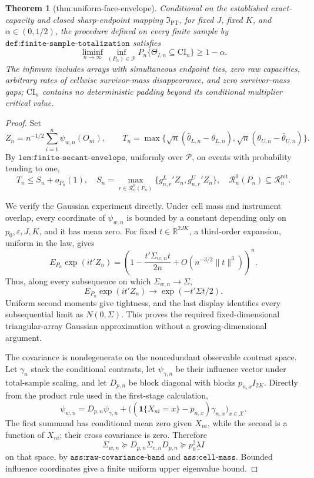 \documentclass{article}
\newtheorem{theorem}{Theorem}
\begin{document}
\begin{theorem}[thm:uniform-face-envelope]\label{thm:uniform-face-envelope}
Conditional on the established exact-capacity and closed sharp-endpoint mapping \(\mathfrak I_{\mathrm{PT}}\), for fixed \(J\), fixed \(K\), and \(\alpha\in(0,1/2)\), the procedure defined on every finite sample by \(\texttt{def:finite-sample-totalization}\) satisfies \[\liminf_{n\to\infty}\inf_{(P_n)\in\mathcal P}P_n\{\Theta_{I,n}\subseteq\mathrm{CI}_n\}\ge1-\alpha.\] The infimum includes arrays with simultaneous endpoint ties, zero raw capacities, arbitrary rates of cellwise survivor-mass disappearance, and zero survivor-mass gaps; \(\mathrm{CI}_n\) contains no deterministic padding beyond its conditional multiplier critical value.
\end{theorem}
\begin{proof}
Set
\[
 Z_n=n^{-1/2}\sum_{i=1}^n\psi_{w,n}(O_{ni}),
 \qquad
 T_n=\max\{\sqrt n(\widehat\theta_{L,n}-\theta_{L,n}),
              \sqrt n(\theta_{U,n}-\widehat\theta_{U,n})\}.
\]
By \(\texttt{lem:finite-secant-envelope}\), uniformly over \(\mathcal P\), on events with probability tending to one,
\[
 T_n\le S_n+o_{P_n}(1),
 \quad
 S_n=\max_{r\in\mathcal R_n^0(P_n)}
 \{g^L_{n,r}{}'Z_n,g^U_{n,r}{}'Z_n\},
 \quad
 \mathcal R_n^0(P_n)\subseteq\mathcal R_n^{\mathrm{ret}}.
\]

We verify the Gaussian experiment directly. Under cell mass and instrument overlap, every coordinate of \(\psi_{w,n}\) is bounded by a constant depending only on \(p_0,\varepsilon,J,K\), and it has mean zero. For fixed \(t\in\mathbb R^{2JK}\), a third-order expansion, uniform in the law, gives
\[
 E_{P_n}\exp(i t'Z_n)
 =\left(1-\frac{t'\Sigma_{w,n}t}{2n}
          +O(n^{-3/2}\lVert t\rVert^3)\right)^n.
\]
Thus, along every subsequence on which \(\Sigma_{w,n}\to\Sigma\),
\[
 E_{P_n}\exp(i t'Z_n)\longrightarrow
 \exp(-t'\Sigma t/2).
\]
Uniform second moments give tightness, and the last display identifies every subsequential limit as \(N(0,\Sigma)\). This proves the required fixed-dimensional triangular-array Gaussian approximation without a growing-dimensional argument.

The covariance is nondegenerate on the nonredundant observable contrast space. Let \(\gamma_n\) stack the conditional contrasts, let \(\psi_{\gamma,n}\) be their influence vector under total-sample scaling, and let \(D_{p,n}\) be block diagonal with blocks \(p_{n,x}I_{2K}\). Directly from the product rule used in the first-stage calculation,
\[
 \psi_{w,n}=D_{p,n}\psi_{\gamma,n}
 +\bigl((\mathbf1\{X_{ni}=x\}-p_{n,x})\gamma_{n,x}\bigr)_{x\in\mathcal X}.
\]
The first summand has conditional mean zero given \(X_{ni}\), while the second is a function of \(X_{ni}\); their cross covariance is zero. Therefore
\[
 \Sigma_{w,n}\succeq D_{p,n}\Sigma_{c,n}D_{p,n}
 \succeq p_0^2\underline\lambda I
\]
on that space, by \(\texttt{ass:raw-covariance-band}\) and \(\texttt{ass:cell-mass}\). Bounded influence coordinates give a finite uniform upper eigenvalue bound.


\end{proof}
\end{document}
